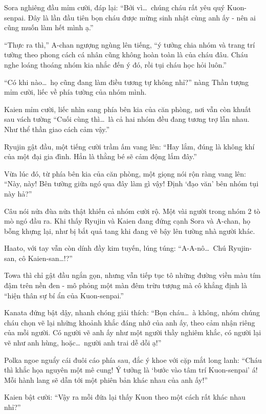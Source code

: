 \documentclass[../main.tex]{subfiles}
\begin{document}
Sora nghiêng đầu mỉm cười, đáp lại: ``Bởi vì\dots\ chúng cháu rất yêu quý Kuon-senpai. Đây là lần đầu tiên bọn cháu được mừng sinh nhật cùng anh ấy - nên ai cũng muốn làm hết mình ạ.''

``Thực ra thì,'' A-chan ngượng ngùng lên tiếng, ``ý tưởng chia nhóm và trang trí tường theo phong cách cá nhân cũng không hoàn toàn là của cháu đâu. Cháu nghe loáng thoáng nhóm kia nhắc đến ý đó, rồi tụi cháu học hỏi luôn.''

``Có khi nào\dots\ họ cũng đang làm điều tương tự không nhỉ?'' nàng Thần tượng mỉm cười, liếc về phía tường của nhóm mình.

Kaien mỉm cười, liếc nhìn sang phía bên kia của căn phòng, nơi vẫn còn khuất sau vách tường ``Cuối cùng thì\dots\ là cả hai nhóm đều đang tương trợ lẫn nhau. Như thể thần giao cách cảm vậy.''

Ryujin gật đầu, một tiếng cười trầm ấm vang lên: ``Hay lắm, đúng là không khí của một đại gia đình. Hẳn là thằng bé sẽ cảm động lắm đây.''

Vừa lúc đó, từ phía bên kia của căn phòng, một giọng nói rộn ràng vang lên: ``Này, này! Bên tường giữa ngó qua đây làm gì vậy! Định `đạo văn' bên nhóm tụi này hả?''

Câu nói nửa đùa nửa thật khiến cả nhóm cười rộ. Một vài người trong nhóm 2 tò mò ngó đầu ra. Khi thấy Ryujin và Kaien đang đứng cạnh Sora và A-chan, họ bỗng khựng lại, như bị bắt quả tang khi đang vẽ bậy lên tường nhà người khác.

Haato, với tay vẫn còn dính đầy kim tuyến, lúng túng: ``A-A-nô\dots\ Chú Ryujin-san, cô Kaien-san\dots!?''

Towa thì chỉ gật đầu ngắn gọn, nhưng vẫn tiếp tục tô những đường viền màu tím đậm trên nền đen - mô phỏng một màn đêm trừu tượng mà cô khẳng định là ``hiện thân sự bí ẩn của Kuon-senpai.''

Kanata đứng bật dậy, nhanh chóng giải thích: ``Bọn cháu\dots\ à không, nhóm chúng cháu chọn vẽ lại những khoảnh khắc đáng nhớ của anh ấy, theo cảm nhận riêng của mỗi người. Có người vẽ anh ấy như một người thầy nghiêm khắc, có người lại vẽ như anh hùng, hoặc\dots\ người anh trai dễ dỗi ạ!''

Polka ngoe nguẩy cái đuôi cáo phía sau, đắc ý khoe với cặp mắt long lanh: ``Cháu thì khắc họa nguyên một mê cung! Ý tưởng là `bước vào tâm trí Kuon-senpai' á! Mỗi hành lang sẽ dẫn tới một phiên bản khác nhau của anh ấy!''

Kaien bật cười: ``Vậy ra mỗi đứa lại thấy Kuon theo một cách rất khác nhau nhỉ?''
\end{document}

